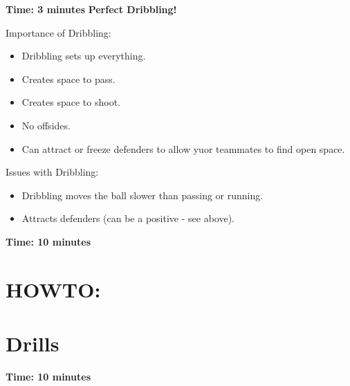 \documentclass[10pt,letterpaper]{article}
\newenvironment{myalertblock}[1]{%
    \tcolorbox[beamer,%
    noparskip,breakable,
    colback=LightCoral,colframe=DarkRed,%
    colbacklower=Tomato!75!LightCoral,%
    title=#1]}%
    {\endtcolorbox}
\begin{document}
\textbf{Time: 3 minutes}
\begin{myalertblock}{Theme of the Practice}
    \textbf{Perfect Dribbling!}

    Importance of Dribbling:
    \begin{itemize}
        \setlength{\itemsep}{0pt}
        \setlength{\parskip}{0pt}
        \setlength{\parsep}{0pt}
        \item Dribbling sets up everything.
        \item Creates space to pass.
        \item Creates space to shoot.
        \item No offsides.
        \item Can attract or freeze defenders to allow yuor teammates to find open space.
    \end{itemize}

    Issues with Dribbling:
    \begin{itemize}
        \setlength{\itemsep}{0pt}
        \setlength{\parskip}{0pt}
        \setlength{\parsep}{0pt}
        \item Dribbling moves the ball slower than passing or running.
        \item Attracts defenders (can be a positive - see above).
    \end{itemize}

\end{myalertblock}

\textbf{Time: 10 minutes}


\section{HOWTO:}


\section{Drills}


\textbf{Time: 10 minutes}

\end{document}
